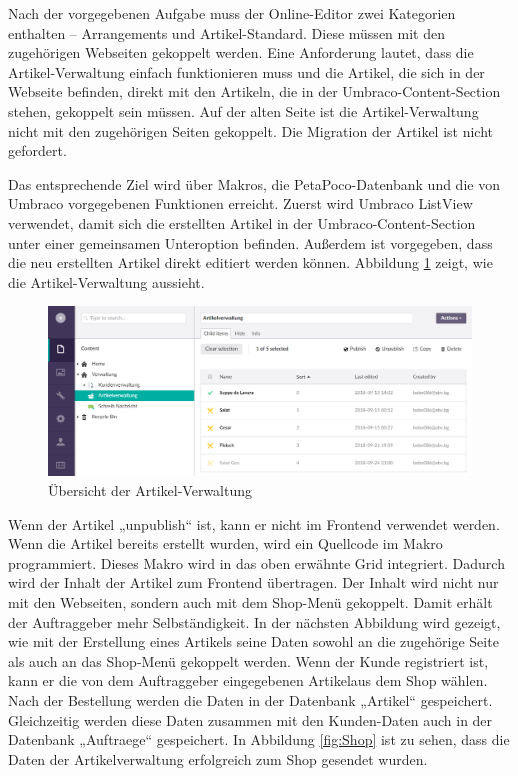 Nach der vorgegebenen Aufgabe muss der Online-Editor zwei Kategorien enthalten – Arrangements und Artikel-Standard. Diese müssen mit den zugehörigen Webseiten gekoppelt werden. Eine Anforderung lautet, dass die Artikel-Verwaltung einfach funktionieren muss und die Artikel, die sich in der Webseite befinden, direkt mit den Artikeln, die in der Umbraco-Content-Section stehen, gekoppelt sein müssen. Auf der alten Seite ist die Artikel-Verwaltung nicht mit den zugehörigen Seiten gekoppelt. Die Migration der Artikel ist nicht gefordert.

Das entsprechende Ziel wird über Makros, die PetaPoco-Datenbank \cite{Robinson2018} und die von Umbraco vorgegebenen Funktionen erreicht. Zuerst wird Umbraco ListView verwendet, damit sich die erstellten Artikel in der Umbraco-Content-Section unter einer gemeinsamen Unteroption befinden. Außerdem ist vorgegeben, dass die neu erstellten Artikel direkt editiert werden können. Abbildung \ref{fig:ArtikelVerwaltung} zeigt, wie die Artikel-Verwaltung aussieht.

\begin{figure}[h]
	\centering
	\includegraphics[width=1\linewidth]{Graphics/ArtikelVerwaltung.png}
	\caption[ArtikelVerwaltung]{Übersicht der Artikel-Verwaltung}
	\label{fig:ArtikelVerwaltung}
\end{figure}

Wenn der Artikel „unpublish“ ist, kann er nicht im Frontend verwendet werden. Wenn die Artikel bereits erstellt wurden, wird ein Quellcode im Makro programmiert. Dieses Makro wird in das oben erwähnte Grid integriert. Dadurch wird der Inhalt der Artikel zum Frontend übertragen. Der Inhalt wird nicht nur mit den Webseiten, sondern auch mit dem Shop-Menü gekoppelt. Damit erhält der Auftraggeber mehr Selbständigkeit. In der nächsten Abbildung wird gezeigt, wie mit der Erstellung eines Artikels seine Daten sowohl an die zugehörige Seite als auch an das Shop-Menü gekoppelt werden. Wenn der Kunde registriert ist, kann er die von dem Auftraggeber eingegebenen Artikelaus dem Shop wählen. Nach der Bestellung werden die Daten in der Datenbank „Artikel“ gespeichert. Gleichzeitig werden diese Daten zusammen mit den Kunden-Daten auch in der Datenbank „Auftraege“ gespeichert. In Abbildung \ref{fig:Shop} ist zu sehen, dass die Daten der Artikelverwaltung erfolgreich zum Shop gesendet wurden.


